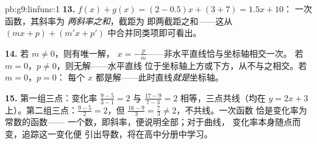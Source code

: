 \begin{solution}{pb:g9:linfunc:1}
\textbf{13.} $f(x) + g(x) = (2 - 0.5)x + (3 + 7) = 1.5x + 10$：
一次函数，其斜率为 \emph{两斜率之和}，截距为
即两截距之和——这从
$(mx + p) + (m'x + p')$ 中合并同类项即可看出。

\textbf{14.} 若 $m \neq 0$，则有唯一解，
$x = -\frac pm$——非水平直线恰与坐标轴相交一次。
若 $m = 0$，$p \neq 0$，则无解——水平直线
位于坐标轴上方或下方，从不与之相交。若 $m = 0$，$p = 0$：
每个 $x$ 都是解——此时直线\emph{就是}坐标轴。

\textbf{15.} 第一组三点：变化率 $\frac{9 - 5}{3 - 1} = 2$ 与
$\frac{17 - 9}{7 - 3} = 2$ 相等，三点共线（均在
$y = 2x + 3$ 上）。第二组三点：$\frac{9-5}{2} = 2$，但
$\frac{16 - 9}{3} = \frac73 \neq 2$，不共线。一次函数
恰是变化率为常数的函数——
一个数，即斜率，便说明全部；对于曲线，
变化率本身随点而变，追踪这一变化便
引出导数，将在高中分册中学习。
\end{solution}
